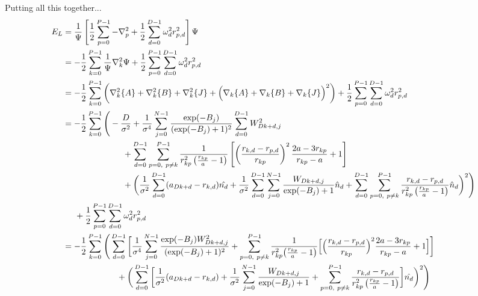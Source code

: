 \documentclass[12pt]{article}
\begin{document}
Putting all this together...
\begin{align*}
E_L &= \frac{1}{\Psi} \left[ \frac{1}{2} \sum_{p=0}^{P-1} -\nabla_p^2 + \frac{1}{2}\sum_{d=0}^{D-1} \omega_d^2r_{p,d}^2 \right] \Psi \\
&= -\frac{1}{2} \sum_{k=0}^{P-1} \frac{1}{\Psi} \nabla_k^2 \Psi + \frac{1}{2} \sum_{p=0}^{P-1} \sum_{d=0}^{D-1} \omega_d^2r_{p,d}^2\\
&= -\frac{1}{2} \sum_{k=0}^{P-1} 
\bigg( \nabla_k^2 \{ A \}  + \nabla_k^2 \{ B \}  + \nabla_k^2 \{ J \} + \Big( \nabla_k \{ A \}  + \nabla_k \{ B \}  + \nabla_k \{ J \}\Big)^2 \bigg)
+ \frac{1}{2} \sum_{p=0}^{P-1} \sum_{d=0}^{D-1} \omega_d^2r_{p,d}^2\\
&= -\frac{1}{2} \sum_{k=0}^{P-1} 
\Bigg( -\frac{D}{\sigma^2}  + \frac{1}{\sigma^4} \sum_{j=0}^{N-1} \frac{\exp(-B_j)}{(\exp(-B_j)+1)^2} \sum_{d=0}^{D-1} W_{Dk+d,j}^2  \\
& \hspace*{2.5 cm} 
+ \sum_{d=0}^{D-1} \sum_{p=0, \ p\neq k}^{P-1}  \frac{1}{r_{kp}^2 \left( \frac{r_{kp}}{a} -1 \right)}
\left[ 
\left( \frac{r_{k,d}-r_{p,d}}{r_{kp}} \right)^2 \frac{2a-3r_{kp}}{r_{kp}-a}
 +1
\right]\\
& \hspace*{2.5 cm}
 + \bigg( \frac{1}{\sigma^2} \sum_{d=0}^{D-1} (a_{Dk+d} -r_{k,d} ) \hat{n_{d}}  
 + \frac{1}{\sigma^2} \sum_{d=0}^{D-1} \sum_{j=0}^{N-1}  \frac{W_{Dk+d,j}}{\exp(-B_j)+1}   \hat{n}_d  
 + \sum_{d=0}^{D-1} \sum_{p=0, \ p\neq k}^{P-1} \frac{r_{k,d}-r_{p,d}}{r_{kp}^2 \left( \frac{r_{kp}}{a} -1 \right)} \hat{n}_d
 \bigg)^2 \Bigg)\\
& \hspace*{.5 cm} + \frac{1}{2} \sum_{p=0}^{P-1} \sum_{d=0}^{D-1} \omega_d^2r_{p,d}^2\\
&= -\frac{1}{2} \sum_{k=0}^{P-1} 
\Bigg( \sum_{d=0}^{D-1} \bigg[ \frac{1}{\sigma^4} \sum_{j=0}^{N-1} \frac{\exp(-B_j)W_{Dk+d,j}^2}{(\exp(-B_j)+1)^2}
+ \sum_{p=0, \ p\neq k}^{P-1}  \frac{1}{r_{kp}^2 \big( \frac{r_{kp}}{a} -1 \big)}
\Big[ 
\Big( \frac{r_{k,d}-r_{p,d}}{r_{kp}} \Big)^2 \frac{2a-3r_{kp}}{r_{kp}-a}
 +1
\Big]  \bigg] \\
& \hspace*{2.25 cm}
+ \bigg( \sum_{d=0}^{D-1} \bigg[
\frac{1}{\sigma^2}(a_{Dk+d} -r_{k,d} )
+\frac{1}{\sigma^2}\sum_{j=0}^{N-1}  \frac{W_{Dk+d,j}}{\exp(-B_j)+1}
+\sum_{p=0, \ p\neq k}^{P-1} \frac{r_{k,d}-r_{p,d}}{r_{kp}^2 \left( \frac{r_{kp}}{a} -1 \right)}
 \bigg] \hat{n_{d}}
 \bigg)^2 \Bigg)\\

\end{align*}
\end{document}
